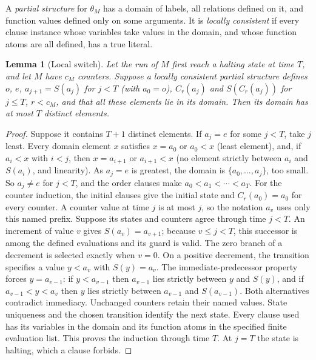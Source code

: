 \documentclass[11pt,a4paper]{article}
\newtheorem{lemma}[theorem]{Lemma}
\theoremstyle{definition}\newtheorem{definition}[theorem]{Definition}
\theoremstyle{remark}\newtheorem{remark}[theorem]{Remark}
\begin{document}
A \emph{partial structure} for $\theta_M$ has a domain of labels, all relations defined on it, and
function values defined only on some arguments. It is \emph{locally consistent} if every clause
instance whose variables take values in the domain, and whose function atoms are all defined,
has a true literal.

\begin{lemma}[Local switch]\label{lem:local-switch}
Let the run of $M$ first reach a halting state at time $T$, and let $M$ have $c_M$ counters.
Suppose a locally consistent partial structure defines $o$, $e$, $a_{j+1}=S(a_j)$ for $j<T$
\textup{(}with $a_0=o$\textup{)}, $C_r(a_j)$ and $S(C_r(a_j))$ for $j\le T$, $r<c_M$, and that all these
elements lie in its domain. Then its domain has at most $T$ distinct elements.
\end{lemma}
\begin{proof}
Suppose it contains $T+1$ distinct elements. If $a_j=e$ for some $j<T$, take $j$ least. Every
domain element $x$ satisfies $x=a_0$ or $a_0<x$ (least element), and, if $a_i<x$ with $i<j$, then
$x=a_{i+1}$ or $a_{i+1}<x$ (no element strictly between $a_i$ and $S(a_i)$, and linearity). As
$a_j=e$ is greatest, the domain is $\{a_0,\ldots,a_j\}$, too small. So $a_j\ne e$ for $j<T$, and
the order clauses make $a_0<a_1<\cdots<a_T$. For the counter induction, the initial clauses give the initial
state and $C_r(a_0)=a_0$ for every counter. A counter value at time $j$
is at most $j$, so the notation $a_v$ uses only this named prefix.
Suppose its states and counters agree through time $j<T$.
An increment of value $v$ gives $S(a_v)=a_{v+1}$; because $v\le j<T$,
this successor is among the defined evaluations and its guard is valid.
The zero branch of a decrement is selected exactly when $v=0$.
On a positive decrement, the transition specifies a value $y<a_v$
with $S(y)=a_v$. The immediate-predecessor property forces
$y=a_{v-1}$: if $y<a_{v-1}$ then $a_{v-1}$ lies strictly between
$y$ and $S(y)$, and if $a_{v-1}<y<a_v$ then $y$ lies strictly
between $a_{v-1}$ and $S(a_{v-1})$. Both alternatives contradict
immediacy. Unchanged counters retain their named values. State
uniqueness and the chosen transition identify the next state.
Every clause used has its variables in the domain and its function
atoms in the specified finite evaluation list. This proves the
induction through time $T$. At $j=T$ the state is halting, which a clause forbids.
\end{proof}
\end{document}
